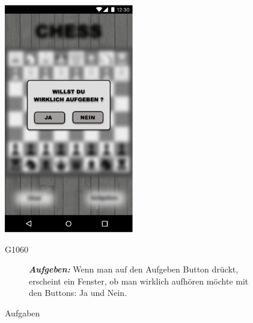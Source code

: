 \documentclass[parskip=full]{scrartcl}
\begin{document}
\begin{figure}[htp]
	\begin{minipage}[t]{6cm}
		\vspace{0pt}
		\includegraphics[height=100mm]{aufgeben.png}
		\caption{Aufgaben}
		\label{fig:Aufgeben}
	\end{minipage}
	\hfill
	\begin{minipage}[t]{6cm}
		\vspace{0pt}
		\begin{description}
			\item[G1060] \textbf{\textit{Aufgeben: }} Wenn man auf den Aufgeben Button drückt, erscheint ein Fenster, ob man wirklich aufhören möchte mit den Buttons: Ja und Nein.
		\end{description}
	\end{minipage}
\end{figure}
\end{document}
